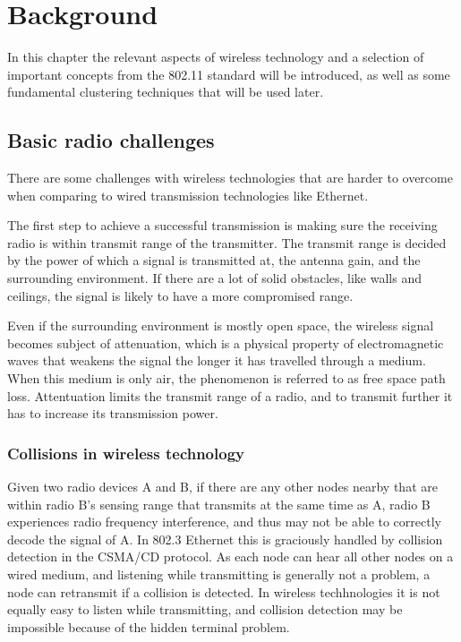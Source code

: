\chapter{Background}
In this chapter the relevant aspects of wireless technology and a selection of important
concepts from the 802.11 standard will be introduced, as well as some fundamental clustering techniques that will be used later. 

\section{Basic radio challenges}
There are some challenges with wireless technologies that are harder to overcome when comparing to wired transmission technologies like Ethernet.

The first step to achieve a successful transmission is making sure the receiving radio is within transmit range of the transmitter. The
transmit range is decided by the power of which a signal is transmitted at, the antenna gain, and the surrounding 
environment. If there are a lot of solid obstacles, like walls and ceilings, the signal is likely to have a more compromised range.

Even if the surrounding environment is mostly open space, the wireless signal becomes subject of attenuation,
     which is a physical property of electromagnetic waves that weakens the signal the longer it has travelled through a
     medium. When this medium is only air, the phenomenon is referred to as free space path loss. Attentuation limits
     the transmit range of a radio, and to transmit further it has to increase its transmission power.

     \subsection{Collisions in wireless technology}
     Given two radio devices A and B, if there are any other nodes nearby that are within radio B's sensing range that transmits at the same time as A, 
     radio B experiences radio frequency interference, and thus may not be able to correctly decode the signal of A. In 802.3 Ethernet this
     is graciously handled by collision detection in the CSMA/CD protocol. As each node can hear all other nodes on a wired medium,
     and listening while transmitting is generally not a problem, a node can retransmit if a collision is detected. In wireless techhnologies
     it is not equally easy to listen while transmitting, and collision detection may be impossible because of the hidden terminal problem.

